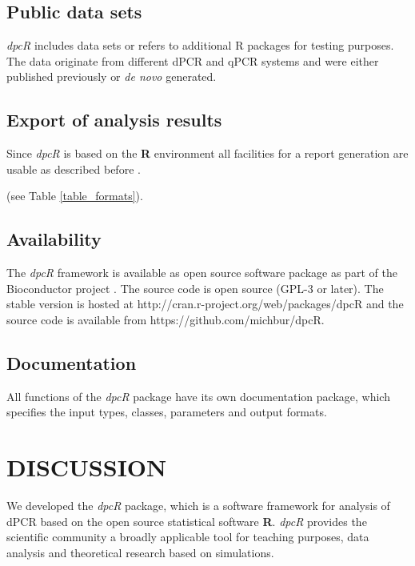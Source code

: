\documentclass[a4,center,fleqn]{NAR}
\begin{document}
\subsection{Public data sets}

\textit{dpcR} includes data sets or refers to additional R packages for testing 
purposes. The data originate from different dPCR and qPCR systems and were 
either published previously \cite{whale_comparison_2012, 
rodiger_chippcr_2015, white_digital_2009, rodiger_r_2015} or \textit{de novo} generated.

\subsection{Export of analysis results}

Since \textit{dpcR} is based on the \textbf{R} environment all facilities for a 
report generation are usable as described before \cite{rodiger_r_2015}.

(see Table \ref{table_formats}).


\subsection{Availability}

The \textit{dpcR} framework is available as open source software package as part 
of the Bioconductor project \cite{gentleman_2004}. The source code is open 
source (GPL-3 or later). The stable version is hosted at 
http://cran.r-project.org/web/packages/dpcR and the source code is available 
from  https://github.com/michbur/dpcR.

\subsection{Documentation}

All functions of the \textit{dpcR} package have its own documentation package, 
which specifies the input types, classes, parameters and output formats.

\section{DISCUSSION}

We developed the \textit{dpcR} package, which is a software framework for analysis of 
dPCR based on the open source statistical software \textbf{R}. \textit{dpcR} provides the scientific 
community a broadly applicable tool for teaching purposes, data analysis and theoretical research based on simulations. 
\end{document}
